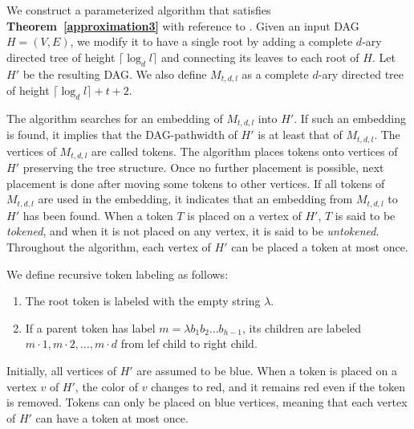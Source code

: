 \documentclass[runningheads]{llncs}
\theoremstyle{plain}
\theoremstyle{definition}
\begin{document}
We construct a parameterized algorithm that satisfies \textbf{Theorem~\ref{approximation3}} with reference to \cite{art8}. Given an input DAG $H = (V, E)$, we modify it to have a single root by adding a complete $d$-ary directed tree of height $\lceil \log_d l \rceil$ and connecting its leaves to each root of $H$. Let $H'$ be the resulting DAG. We also define $M_{t, d, l}$ as a complete $d$-ary directed tree of height $\lceil \log_d l \rceil +t+2$.

The algorithm searches for an embedding of $M_{t, d, l}$ into $H'$. If such an embedding is found, it implies that the DAG-pathwidth of $H'$ is at least that of $M_{t, d, l}$. The vertices of $M_{t, d, l}$ are called tokens. The algorithm places tokens onto vertices of $H'$ preserving the tree structure. Once no further placement is possible, next placement is done after moving some tokens to other vertices. If all tokens of $M_{t, d, l}$ are used in the embedding, it indicates that an embedding from $M_{t, d, l}$ to $H'$ has been found. When a token $T$ is placed on a vertex of $H'$, $T$ is said to be \textit{tokened}, and when it is not placed on any vertex, it is said to be \textit{untokened}. Throughout the algorithm, each vertex of $H'$ can be placed a token at most once.

We define recursive token labeling as follows:
\begin{enumerate}
    \item The root token is labeled with the empty string $\lambda$.
    \item If a parent token has label $m=\lambda b_1 b_2 \dots b_{h-1}$, its children are labeled $m \cdot 1, m \cdot 2, \dots, m \cdot d$ from lef child to right child.
\end{enumerate}

Initially, all vertices of $H'$ are assumed to be blue. When a token is placed on a vertex $v$ of $H'$, the color of $v$ changes to red, and it remains red even if the token is removed. Tokens can only be placed on blue vertices, meaning that each vertex of $H'$ can have a token at most once.



\end{document}
